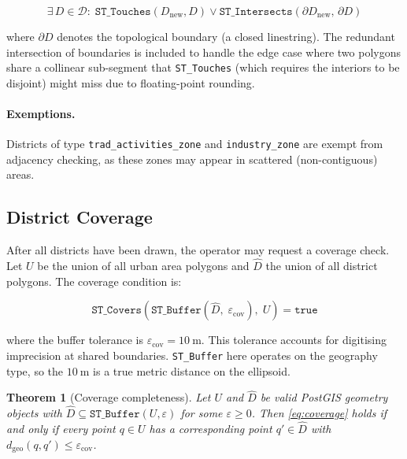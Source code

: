 \documentclass[12pt,a4paper]{article}
\theoremstyle{definition}
\theoremstyle{plain}
\newtheorem{theorem}{Theorem}[section]
\theoremstyle{remark}
\begin{document}
\begin{equation}
  \exists\, D \in \mathcal{D}:\;
  \texttt{ST\_Touches}(D_{\text{new}}, D) \lor
  \texttt{ST\_Intersects}(\partial D_{\text{new}},\, \partial D)
  \label{eq:district_adjacency}
\end{equation}

where $\partial D$ denotes the topological boundary (a closed linestring).
The redundant intersection of boundaries is included to handle the edge
case where two polygons share a collinear sub-segment that
\texttt{ST\_Touches} (which requires the interiors to be disjoint) might
miss due to floating-point rounding.

\paragraph{Exemptions.}
Districts of type \texttt{trad\_activities\_zone} and
\texttt{industry\_zone} are exempt from adjacency checking, as these zones
may appear in scattered (non-contiguous) areas.

\subsection{District Coverage}
\label{sec:coverage}

After all districts have been drawn, the operator may request a coverage
check. Let $U$ be the union of all urban area polygons and $\hat{D}$ the
union of all district polygons. The coverage condition is:

\begin{equation}
  \texttt{ST\_Covers}\!\left(
    \texttt{ST\_Buffer}\!\left(\hat{D},\; \varepsilon_{\text{cov}}\right),\; U
  \right) = \texttt{true}
  \label{eq:coverage}
\end{equation}

where the buffer tolerance is $\varepsilon_{\text{cov}} = 10\ \mathrm{m}$.
This tolerance accounts for digitising imprecision at shared boundaries.
\texttt{ST\_Buffer} here operates on the geography type, so the $10\ \mathrm{m}$
is a true metric distance on the ellipsoid.

\begin{theorem}[Coverage completeness]
Let $U$ and $\hat{D}$ be valid PostGIS geometry objects with
$\hat{D} \subseteq \texttt{ST\_Buffer}(U, \varepsilon)$ for some
$\varepsilon \geq 0$. Then \cref{eq:coverage} holds if and only if every
point $q \in U$ has a corresponding point $q' \in \hat{D}$ with
$d_{\text{geo}}(q, q') \leq \varepsilon_{\text{cov}}$.
\end{theorem}
\end{document}

